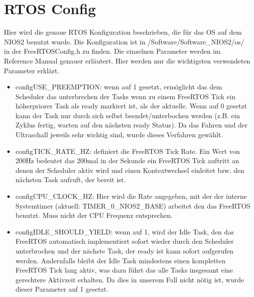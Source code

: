 \section{RTOS Config}
Hier wird die genaue RTOS Konfiguration beschrieben, die für das OS auf dem NIOS2 benutzt wurde. Die Konfiguration ist in /Software/Software\_NIOS2/os/ in der FreeRTOSConfig.h zu finden. Die einzelnen Parameter werden im Reference Manual genauer erläutert. Hier werden nur die wichtigsten verwendeten Parameter erklärt.
\begin{itemize}
 \item configUSE\_PREEMPTION: wenn auf 1 gesetzt, ermöglicht das dem Scheduler das unterbrechen der Tasks wenn zu einem FreeRTOS Tick ein höherpriorer Task als ready markiert ist, als der aktuelle. Wenn auf 0 gesetzt kann der Task nur durch sich selbst beendet/unterbochen werden (z.B. ein Zyklus fertig, warten auf den nächsten ready Status). Da das Fahren und der Ultraschall jeweils sehr wichtig sind, wurde dieses Verfahren gewählt.
 \item configTICK\_RATE\_HZ: definiert die FreeRTOS Tick Rate. Ein Wert von 200Hz bedeutet das 200mal in der Sekunde ein FreeRTOS Tick auftritt an denen der Scheduler aktiv wird und einen Kontextwechsel einleitet bzw. den nächsten Task aufruft, der bereit ist.
 \item configCPU\_CLOCK\_HZ: Hier wird die Rate angegeben, mit der der interne Systemtimer (aktuell: TIMER\_0\_NIOS2\_BASE) arbeitet den das FreeRTOS benutzt. Muss nicht der CPU Frequenz entsprechen.
 \item configIDLE\_SHOULD\_YIELD: wenn auf 1, wird der Idle Task, den das FreeRTOS automatisch implementiert sofort wieder durch den Scheduler unterbrochen und der nächste Task, der ready ist kann sofort aufgerufen werden. Andernfalls bleibt der Idle Task mindestens einen kompletten FreeRTOS Tick lang aktiv, was dazu führt das alle Tasks insgesamt eine gerechtere Aktivzeit erhalten. Da dies in unserem Fall nicht nötig ist, wurde dieser Parameter auf 1 gesetzt.
\end{itemize}
